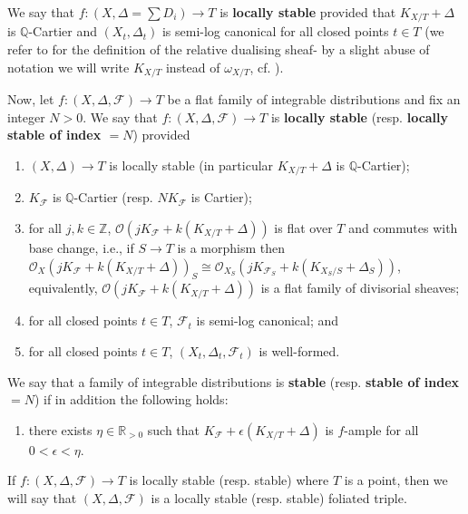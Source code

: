 \documentclass[12pt, a4paper]{amsart}
\theoremstyle{definition}
\theoremstyle{named}
\begin{document}
We say that
$f\colon (X, \Delta = \sum D_i) \rightarrow T$ is {\bf locally stable} provided
that $K_{X/T}+\Delta$ is $\mathbb Q$-Cartier
and $(X_t, \Delta_t)$ is semi-log canonical for all 
closed points $t \in T$ (we refer to \cite[\S 2.68]{modbook} for the definition of the relative dualising sheaf- by a slight abuse of notation we will write $K_{X/T}$ instead of $\omega_{X/T}$, cf. \cite[Definition 3.35]{modbook}).

Now, let $f\colon (X, \Delta, \mathcal F) \rightarrow T$ be a flat family of integrable distributions and fix an integer $N>0$.  
We say that $f\colon (X, \Delta, \mathcal F) \rightarrow T$
is {\bf locally stable} (resp. {\bf locally stable of index $=N$})
provided 
\begin{enumerate}
\item[(S1)] $(X, \Delta) \rightarrow T$
is locally stable (in particular $K_{X/T}+\Delta$ is $\mathbb Q$-Cartier);


    \item[(S2)] $K_{\mathcal F}$
is $\mathbb Q$-Cartier (resp. $NK_{\mathcal F}$ is Cartier); 

\item[(S3)] for all $j, k \in \mathbb Z$, $\mathcal O(jK_{\mathcal F}+k(K_{X/T}+\Delta))$ is flat over $T$ and commutes with base change, i.e., if $S \rightarrow T$ is a morphism then $\mathcal O_X(jK_{\mathcal F}+k(K_{X/T}+\Delta))_S \cong  \mathcal O_{X_S}(jK_{\mathcal F_S}+k(K_{X_S/S}+\Delta_S))$, equivalently, $\mathcal O(jK_{\mathcal F}+k(K_{X/T}+\Delta))$ is a flat family of divisorial sheaves; 

\item[(S4)] for all closed points $t \in T$, $\mathcal F_t$
is semi-log canonical; and 

\item[(S5)] for all closed points $t \in T$, $(X_t, \Delta_t, \mathcal F_t)$ is well-formed.
\end{enumerate} 

We say that a family of integrable distributions
is {\bf stable} (resp. {\bf stable of index} $=N$) if in addition the following holds:
\begin{enumerate}
    \item[(S6)] there exists $\eta \in \mathbb R_{>0}$ such that $K_{\mathcal F}+\epsilon(K_{X/T}+\Delta)$ is $f$-ample for all $0< \epsilon < \eta$.
\end{enumerate}


If $f\colon (X, \Delta, \mathcal F) \to T$ is locally stable (resp. stable) where $T$
is a point, then we will say that $(X, \Delta , \mathcal F)$ is a locally stable (resp. stable) foliated triple.
\end{document}
